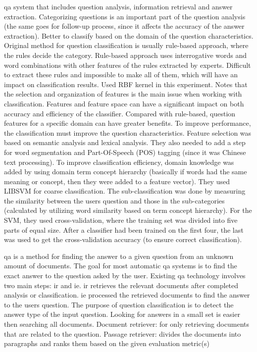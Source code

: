 \gls{qa} system that includes question analysis, information retrieval and answer extraction.
Categorizing questions is an important part of the question analysis (the same goes for follow-up process, since it affects the accuracy of the answer extraction).
Better to classify based on the domain of the question characteristics. 
Original method for question classification is usually rule-based approach, where the rules decide the category. 
Rule-based approach uses interrogative words and word combinations with other features of the rules extracted by experts. 
Difficult to extract these rules and impossible to make all of them, which will have an impact on classification results. 
Used RBF kernel in this experiment. 
Notes that the selection and organization of features is the main issue when working with classification. 
Features and feature space can have a significant impact on both accuracy and efficiency of the classifier. 
Compared with rule-based, question features for a specific domain can have greater benefits. 
To improve performance, the classification must improve the question characteristics. 
Feature selection was based on semantic analysis and lexical analysis. 
They also needed to add a step for word segmentation and Part-Of-Speech (POS) tagging (since it was Chinese text processing). 
To improve classification efficiency, domain knowledge was added by using domain term concept hierarchy (basically if words had the same meaning or concept, then they were added to a feature vector). 
They used LIBSVM for coarse classification. 
The sub-classification was done by measuring the similarity between the users question and those in the sub-categories  (calculated by utilizing word similarity based on term concept hierarchy). 
For the SVM, they used cross-validation, where the training set was divided into five parts of equal size. 
After a classifier had been trained on the first four, the last was used to get the cross-validation accuracy (to ensure correct classification).
\cite{Xu2012}


\gls{qa} is a method for finding the answer to a given question from an unknown amount of documents. 
The goal for most automatic \gls{qa} systems is to find the exact answer to the question asked by the user. 
Existing \gls{qa} technology involves two main steps: \gls{ir} and \gls{ie}.
\gls{ir} retrieves the  relevant documents after completed analysis or classification.
\gls{ie} processed the retrieved documents to find the answer to the users question.
The purpose of question classification is to detect the answer type of the input question. 
Looking for answers in a small set is easier then searching all documents. 
Document retriever: for only retrieving documents that are related to the question.
Passage retriever: divides the documents into paragraphs and ranks them based on the given evaluation metric(s)
\cite{Yen2013}


